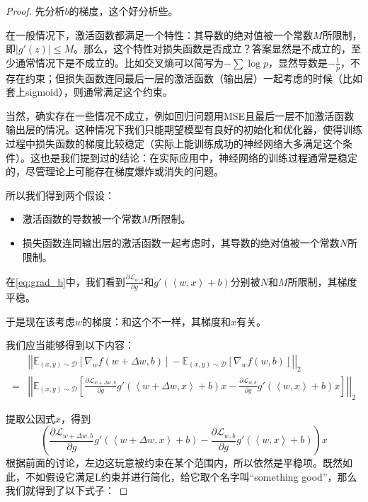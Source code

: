 \begin{proof}
    先分析$b$的梯度，这个好分析些。

    在一般情况下，激活函数都满足一个特性：其导数的绝对值被一个常数$M$所限制，即$|g'(z)| \leq M$。那么，这个特性对损失函数是否成立？答案显然是不成立的，至少通常情况下是不成立的。比如交叉熵可以简写为$-\sum\log p$，显然导数是$-\frac{1}{p}$，不存在约束；但损失函数连同最后一层的激活函数（输出层）一起考虑的时候（比如套上sigmoid），则通常满足这个约束。

    当然，确实存在一些情况不成立，例如回归问题用MSE且最后一层不加激活函数输出层的情况。这种情况下我们只能期望模型有良好的初始化和优化器，使得训练过程中损失函数的梯度比较稳定（实际上能训练成功的神经网络大多满足这个条件）。这也是我们提到过的结论\cite{kexuefm-6992}：在实际应用中，神经网络的训练过程通常是稳定的，尽管理论上可能存在梯度爆炸或消失的问题。

    所以我们得到两个假设：
    \begin{itemize}
        \item 激活函数的导数被一个常数$M$所限制。
        \item 损失函数连同输出层的激活函数一起考虑时，其导数的绝对值被一个常数$N$所限制。
    \end{itemize}

    在\eqref{eq:grad_b}中，我们看到$\frac{\partial \mathcal{L}_{w, b}}{\partial g}$和$g'(\left\langle w, x \right\rangle + b)$分别被$N$和$M$所限制，其梯度平稳。

    于是现在该考虑$w$的梯度：和这个不一样，其梯度和$x$有关。

    我们应当能够得到以下内容：
    \begin{align}
        & \left|\left|\mathbb{E}_{(x,y) \sim \mathcal{D}}[\nabla_w f(w+\Delta w, b)] - \mathbb{E}_{(x,y) \sim \mathcal{D}}[\nabla_w f(w, b)]  \right|\right|_2 \\
        =& \left|\left|\mathbb{E}_{(x,y) \sim \mathcal{D}}\left[\frac{\partial \mathcal{L}_{w+\Delta w, b}}{\partial g}g'(\left\langle w+\Delta w, x \right\rangle + b) x - \frac{\partial \mathcal{L}_{w, b}}{\partial g}g'(\left\langle w, x \right\rangle + b) x\right]  \right|\right|_2
    \end{align}

    提取公因式$x$，得到
    \begin{equation}
        \left(\frac{\partial \mathcal{L}_{w+\Delta w, b}}{\partial g}g'(\left\langle w+\Delta w, x \right\rangle + b) - \frac{\partial \mathcal{L}_{w, b}}{\partial g}g'(\left\langle w, x \right\rangle + b)\right) x
    \end{equation}
    根据前面的讨论，左边这玩意被约束在某个范围内，所以依然是平稳项。既然如此，不如假设它满足L约束并进行简化，给它取个名字叫“something good”，那么我们就得到了以下式子：


\end{proof}
